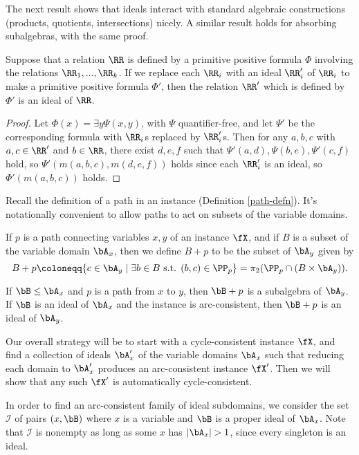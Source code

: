 The next result shows that ideals interact with standard algebraic constructions (products, quotients, intersections) nicely. A similar result holds for absorbing subalgebras, with the same proof.

\begin{prop} Suppose that a relation $\RR$ is defined by a primitive positive formula $\Phi$ involving the relations $\RR_1, ..., \RR_k$. If we replace each $\RR_i$ with an ideal $\RR_i'$ of $\RR_i$ to make a primitive positive formula $\Phi'$, then the relation $\RR'$ which is defined by $\Phi'$ is an ideal of $\RR$.
\end{prop}
\begin{proof} Let $\Phi(x) = \exists y \Psi(x,y)$, with $\Psi$ quantifier-free, and let $\Psi'$ be the corresponding formula with $\RR_i$s replaced by $\RR_i'$s. Then for any $a,b,c$ with $a,c \in \RR'$ and $b \in \RR$, there exist $d,e,f$ such that $\Psi'(a,d), \Psi(b,e), \Psi'(c,f)$ hold, so $\Psi'(m(a,b,c),m(d,e,f))$ holds since each $\RR_i'$ is an ideal, so $\Phi'(m(a,b,c))$ holds.
\end{proof}

Recall the definition of a path in an instance (Definition \ref{path-defn}). It's notationally convenient to allow paths to act on subsets of the variable domains.

\begin{defn}\label{path-action-defn} If $p$ is a path connecting variables $x,y$ of an instance $\fX$, and if $B$ is a subset of the variable domain $\bA_x$, then we define $B + p$ to be the subset of $\bA_y$ given by
\[
B + p \coloneqq \{c \in \bA_y \mid \exists b \in B \text{ s.t. } (b,c) \in \PP_p\} = \pi_2(\PP_p\cap (B \times \bA_y)).
\]
\end{defn}

\begin{prop} If $\bB \le \bA_x$ and $p$ is a path from $x$ to $y$, then $\bB + p$ is a subalgebra of $\bA_y$. If $\bB$ is an ideal of $\bA_x$ and the instance is arc-consistent, then $\bB + p$ is an ideal of $\bA_y$.
\end{prop}

Our overall strategy will be to start with a cycle-consistent instance $\fX$, and find a collection of ideals $\bA_x'$ of the variable domains $\bA_x$ such that reducing each domain to $\bA_x'$ produces an arc-consistent instance $\fX'$. Then we will show that any such $\fX'$ is automatically cycle-consistent.

In order to find an arc-consistent family of ideal subdomains, we consider the set $\mathcal{I}$ of pairs $(x,\bB)$ where $x$ is a variable and $\bB$ is a proper ideal of $\bA_x$. Note that $\mathcal{I}$ is nonempty as long as some $x$ has $|\bA_x| > 1$, since every singleton is an ideal.

